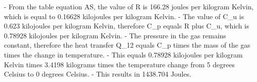 - From the table equation AS, the value of R is 166.28 joules per kilogram Kelvin, which is equal to 0.16628 kilojoules per kilogram Kelvin.
- The value of C_u is 0.623 kilojoules per kilogram Kelvin, therefore C_p equals R plus C_u, which is 0.78928 kilojoules per kilogram Kelvin.
- The pressure in the gas remains constant, therefore the heat transfer Q_12 equals C_p times the mass of the gas times the change in temperature.
- This equals 0.78928 kilojoules per kilogram Kelvin times 3.4198 kilograms times the temperature change from 5 degrees Celsius to 0 degrees Celsius.
- This results in 1438.704 Joules.